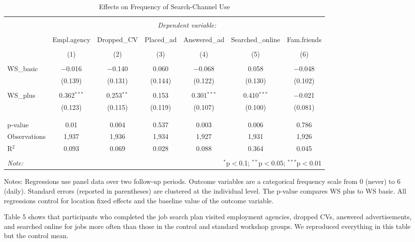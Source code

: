 \documentclass[]{elsarticle} %
\begin{document}
\begin{table}[H] \centering 
  \caption{Effects on Frequency of Search-Channel Use} 
  \label{} 
\begin{tabular}{@{\extracolsep{-8pt}}lcccccc} 
\\[-1.8ex]\hline 
\hline \\[-1.8ex] 
 & \multicolumn{6}{c}{\textit{Dependent variable:}} \\ 
\cline{2-7} 
\\[-1.8ex] & Empl.agency & Dropped\_CV & Placed\_ad & Answered\_ad & Searched\_online & Fam.friends \\ 
\\[-1.8ex] & (1) & (2) & (3) & (4) & (5) & (6)\\ 
\hline \\[-1.8ex] 
 WS\_basic & $-$0.016 & $-$0.140 & 0.060 & $-$0.068 & 0.058 & $-$0.048 \\ 
  & (0.139) & (0.131) & (0.144) & (0.122) & (0.130) & (0.102) \\ 
  & & & & & & \\ 
 WS\_plus & 0.362$^{***}$ & 0.253$^{**}$ & 0.153 & 0.301$^{***}$ & 0.410$^{***}$ & $-$0.021 \\ 
  & (0.123) & (0.115) & (0.119) & (0.107) & (0.100) & (0.081) \\ 
  & & & & & & \\ 
\hline \\[-1.8ex] 
p-value & 0.01 & 0.004 & 0.537 & 0.003 & 0.006 & 0.786 \\ 
Observations & 1,937 & 1,936 & 1,934 & 1,927 & 1,931 & 1,926 \\ 
R$^{2}$ & 0.093 & 0.069 & 0.028 & 0.088 & 0.364 & 0.045 \\ 
\hline 
\hline \\[-1.8ex] 
\textit{Note:}  & \multicolumn{6}{r}{$^{*}$p$<$0.1; $^{**}$p$<$0.05; $^{***}$p$<$0.01} \\ 
\end{tabular} 
\end{table}

Notes: Regressions use panel data over two follow-up periods. Outcome
variables are a categorical frequency scale from 0 (never) to 6 (daily).
Standard errors (reported in parentheses) are clustered at the
individual level. The p-value compares WS plus to WS basic. All
regressions control for location fixed effects and the baseline value of
the outcome variable.

Table 5 shows that participants who completed the job search plan
visited employment agencies, dropped CVs, answered advertisements, and
searched online for jobs more often than those in the control and
standard workshop groups. We reproduced everything in this table but the
control mean.
\end{document}
